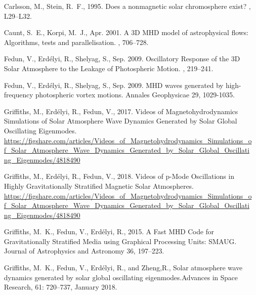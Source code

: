 \documentclass{aastex62}
\begin{document}
\begin{thebibliography}{}


{Carlsson}, M., {Stein}, R.~F., 1995. {Does a nonmagnetic solar chromosphere
  exist?} , L29--L32.

{Caunt}, S.~E., {Korpi}, M.~J., Apr. 2001. A {3D} {MHD} model of astrophysical
  flows: Algorithms, tests and parallelisation. , 706--728.

{Fedun}, V., {Erd{\'e}lyi}, R., {Shelyag}, S., Sep. 2009. {Oscillatory Response
  of the 3D Solar Atmosphere to the Leakage of Photospheric Motion}. , 219--241.

{Fedun}, V., {Erd{\'e}lyi}, R., {Shelyag}, S., Sep. 2009. {MHD waves generated by high-frequency photospheric vortex motions}. Annales Geophysicae
  29, 1029-1035.

{Griffiths}, M., {Erd{\'e}lyi}, R., {Fedun}, V., 2017. {Videos of
  Magnetohydrodynamics Simulations of Solar Atmosphere Wave Dynamics Generated
  by Solar Global Oscillating Eigenmodes}.
\newline \url{https://figshare.com/articles/Videos_of_Magnetohydrodynamics_Simulations_of_Solar_Atmosphere_Wave_Dynamics_Generated_by_Solar_Global_Oscillating_Eigenmodes/4818490}

{Griffiths}, M., {Erd{\'e}lyi}, R., {Fedun}, V., 2018. {Videos of p-Mode Oscillations in Highly Gravitationally Stratified Magnetic Solar Atmospheres}.
\newline \url{https://figshare.com/articles/Videos_of_Magnetohydrodynamics_Simulations_of_Solar_Atmosphere_Wave_Dynamics_Generated_by_Solar_Global_Oscillating_Eigenmodes/4818490}

{Griffiths}, M.~K., {Fedun}, V., {Erd{\'e}lyi}, R., 2015. {A Fast MHD Code for
  Gravitationally Stratified Media using Graphical Processing Units: SMAUG}.
  Journal of Astrophysics and Astronomy 36, 197--223.


{Griffiths}, M.~K., {Fedun}, V., {Erd{\'e}lyi}, R., and {Zheng},R.,
{Solar atmosphere wave dynamics generated by solar global oscillating
  eigenmodes}.{Advances in Space Research}, 61: 720--737, January 2018.



\end{thebibliography}
\end{document}
